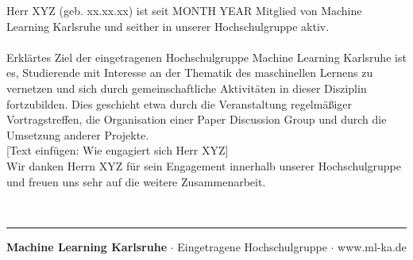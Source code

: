 \documentclass[12pt, a4paper]{article}
\date{}
\title{\flushleft{\textbf{Bescheinigung über Mitgliedschaft \protect\\ und  Engagement}}}
\begin{document}
\vspace*{-2cm}
{\let\newpage\relax\maketitle}
\vspace{1.0cm}
\thispagestyle{fancy}
Herr XYZ (geb. xx.xx.xx) ist seit MONTH YEAR Mitglied von Machine Learning Karlsruhe und seither in unserer Hochschulgruppe aktiv.\\\\
Erklärtes Ziel der eingetragenen Hochschulgruppe Machine Learning Karlsruhe ist es, Studierende mit Interesse an der Thematik des maschinellen Lernens zu vernetzen und sich durch gemeinschaftliche Aktivitäten in dieser Disziplin fortzubilden.
Dies geschieht etwa durch die Veranstaltung regelmäßiger Vortragstreffen, die Organisation einer Paper Discussion Group und durch die Umsetzung anderer Projekte.\\

[Text einfügen: Wie engagiert sich Herr XYZ]
\\

Wir danken Herrn XYZ für sein Engagement innerhalb unserer Hochschulgruppe und freuen uns sehr auf die weitere Zusammenarbeit.
\vfill
        \par\noindent\makebox[2.0in]{\hrulefill} \hfill\makebox[2.0in]{\hrulefill}%
        \par\noindent{}      \hfill{}%
\\
\noindent\rule{\textwidth}{1pt}
\begin{center}
{\small \textbf{Machine Learning Karlsruhe} $\cdot$ Eingetragene Hochschulgruppe $\cdot$ www.ml-ka.de}\\[0.5\baselineskip]
\end{center}
    
\end{document}
